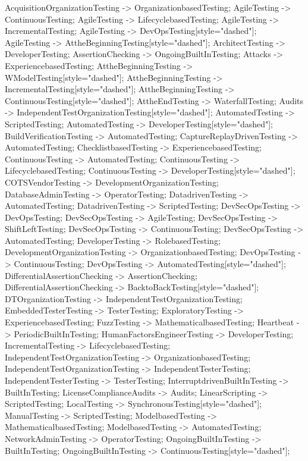 \documentclass{article}
\begin{document}
{AcquisitionOrganizationTesting -> OrganizationbasedTesting;
AgileTesting -> ContinuousTesting;
AgileTesting -> LifecyclebasedTesting;
AgileTesting -> IncrementalTesting;
AgileTesting -> DevOpsTesting[style="dashed"];
AgileTesting -> AttheBeginningTesting[style="dashed"];
ArchitectTesting -> DeveloperTesting;
AssertionChecking -> OngoingBuiltInTesting;
Attacks -> ExperiencebasedTesting;
AttheBeginningTesting -> WModelTesting[style="dashed"];
AttheBeginningTesting -> IncrementalTesting[style="dashed"];
AttheBeginningTesting -> ContinuousTesting[style="dashed"];
AttheEndTesting -> WaterfallTesting;
Audits -> IndependentTestOrganizationTesting[style="dashed"];
AutomatedTesting -> ScriptedTesting;
AutomatedTesting -> DeveloperTesting[style="dashed"];
BuildVerificationTesting -> AutomatedTesting;
CaptureReplayDrivenTesting -> AutomatedTesting;
ChecklistbasedTesting -> ExperiencebasedTesting;
ContinuousTesting -> AutomatedTesting;
ContinuousTesting -> LifecyclebasedTesting;
ContinuousTesting -> DeveloperTesting[style="dashed"];
COTSVendorTesting -> DevelopmentOrganizationTesting;
DatabaseAdminTesting -> OperatorTesting;
DatadrivenTesting -> AutomatedTesting;
DatadrivenTesting -> ScriptedTesting;
DevSecOpsTesting -> DevOpsTesting;
DevSecOpsTesting -> AgileTesting;
DevSecOpsTesting -> ShiftLeftTesting;
DevSecOpsTesting -> ContinuousTesting;
DevSecOpsTesting -> AutomatedTesting;
DeveloperTesting -> RolebasedTesting;
DevelopmentOrganizationTesting -> OrganizationbasedTesting;
DevOpsTesting -> ContinuousTesting;
DevOpsTesting -> AutomatedTesting[style="dashed"];
DifferentialAssertionChecking -> AssertionChecking;
DifferentialAssertionChecking -> BacktoBackTesting[style="dashed"];
DTOrganizationTesting -> IndependentTestOrganizationTesting;
EmbeddedTesterTesting -> TesterTesting;
ExploratoryTesting -> ExperiencebasedTesting;
FuzzTesting -> MathematicalbasedTesting;
Heartbeat -> PeriodicBuiltInTesting;
HumanFactorsEngineerTesting -> DeveloperTesting;
IncrementalTesting -> LifecyclebasedTesting;
IndependentTestOrganizationTesting -> OrganizationbasedTesting;
IndependentTestOrganizationTesting -> IndependentTesterTesting;
IndependentTesterTesting -> TesterTesting;
InterruptdrivenBuiltInTesting -> BuiltInTesting;
LicenseComplianceAudits -> Audits;
LinearScripting -> ScriptedTesting;
LocalTesting -> SynchronousTesting[style="dashed"];
ManualTesting -> ScriptedTesting;
ModelbasedTesting -> MathematicalbasedTesting;
ModelbasedTesting -> AutomatedTesting;
NetworkAdminTesting -> OperatorTesting;
OngoingBuiltInTesting -> BuiltInTesting;
OngoingBuiltInTesting -> ContinuousTesting[style="dashed"];
}
\end{document}
